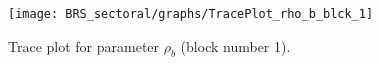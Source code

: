 \begin{figure}[H]
\centering
  \texttt{[image: BRS\_sectoral/graphs/TracePlot\_rho\_b\_blck\_1]}\\
    \caption{Trace plot for parameter ${\rho_b}$ (block number 1).}
\end{figure}
